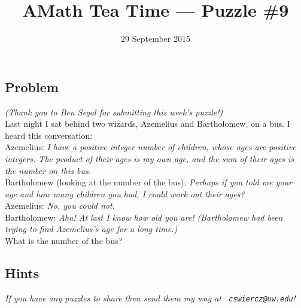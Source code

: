 \documentclass[12pt]{article}
\title{AMath Tea Time --- Puzzle \#9}
\author{}
\date{\vspace{-1cm}29 September 2015}
\begin{document}
\maketitle
{}

\subsection*{Problem}

{\it (Thank you to Ben Segal for submitting this week's puzzle!)} \\

\noindent Last night I sat behind two wizards, Azemelius and Bartholomew, on a
bus. I heard this conversation: \\

\noindent Azemelius: {\it I have a positive integer number of children, whose
  ages are positive integers. The product of their ages is my own age, and the
  sum of their ages is the number on this bus.} \\

\noindent Bartholomew (looking at the number of the bus): {\it Perhaps if you
  told me your age and how many children you had, I could work out their ages?}
\\

\noindent Azemelius: {\it No, you could not.} \\

\noindent Bartholomew: {\it Aha! At last I know how old you are!  (Bartholomew
  had been trying to find Azemelius’s age for a long time.)} \\

\noindent What is the number of the bus? \\

\subsection*{Hints}

{
\par\vspace*{\fill}
\noindent \small \it
If you have any puzzles to share then send them my way at {\tt
  cswiercz@uw.edu}!
}
\end{document}
